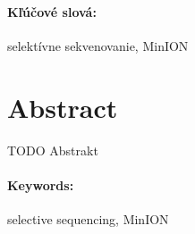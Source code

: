 \documentclass[12pt, twoside]{book}
\begin{document}
\paragraph*{Kľúčové slová:} selektívne sekvenovanie, MinION


\newpage 
\section*{Abstract}

TODO Abstrakt


\paragraph*{Keywords:} selective sequencing, MinION


%
%



\newpage 

\tableofcontents






\mainmatter











%
\end{document}
